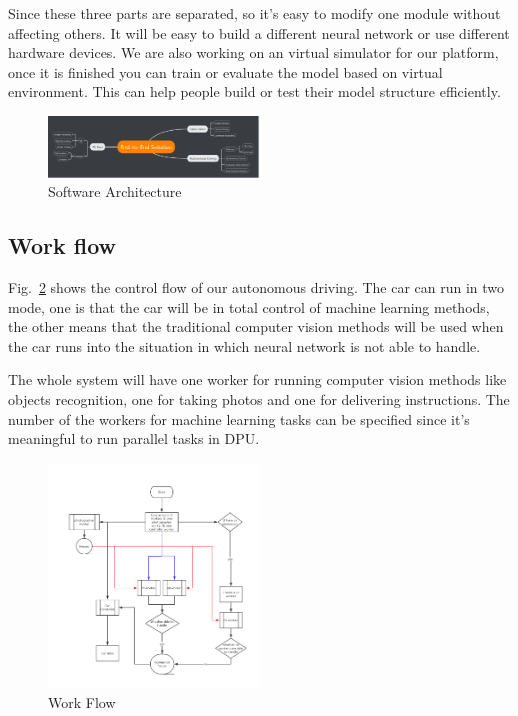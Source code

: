 \documentclass[conference]{IEEEtran}
\begin{document}
Since these three parts are separated, so it's easy to modify one module without affecting others. It will be easy to build a different neural network or use different hardware devices. We are also working on an virtual simulator for our platform, once it is finished you can train or evaluate the model based on virtual environment. This can help people build or test their model structure efficiently.
\begin{figure}[htbp]
\centerline{\includegraphics[width=0.5\textwidth]{software-architecture.jpg}}
\caption{Software Architecture}
\label{sa}
\end{figure}

\subsection{Work flow}

Fig.~\ref{wf} shows the control flow of our autonomous driving. The car can run in two mode, one is that the car will be in total control of machine learning methods, the other means that the traditional computer vision methods will be used when the car runs into the situation in which neural network is not able to handle.

The whole system will have one worker for running computer vision methods like objects recognition, one for taking photos and one for delivering instructions. The number of the workers for machine learning tasks can be specified since it's meaningful to run parallel tasks in DPU.

\begin{figure}[htbp]
\centerline{\includegraphics[width=0.5\textwidth]{workFlow.jpg}}
\caption{Work Flow}
\label{wf}
\end{figure}
\end{document}
